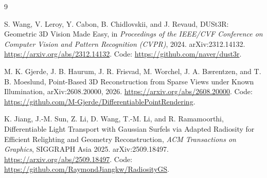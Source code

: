\documentclass[11pt,a4paper]{article}
\begin{document}
\begin{thebibliography}{9}

S. Wang, V. Leroy, Y. Cabon, B. Chidlovskii, and J. Revaud,
\newblock DUSt3R: Geometric 3D Vision Made Easy,
\newblock in \emph{Proceedings of the IEEE/CVF Conference on Computer
Vision and Pattern Recognition (CVPR)}, 2024.
\newblock arXiv:2312.14132.
\newblock \url{https://arxiv.org/abs/2312.14132}.
\newblock Code: \url{https://github.com/naver/dust3r}.

M. K. Gjerde, J. B. Haurum, J. R. Frisvad, M. Worchel,
J. A. B{\ae}rentzen, and T. B. Moeslund,
\newblock Point-Based 3D Reconstruction from Sparse Views under Known
Illumination,
\newblock arXiv:2608.20000, 2026.
\newblock \url{https://arxiv.org/abs/2608.20000}.
\newblock Code: \url{https://github.com/M-Gjerde/DifferentiablePointRendering}.

K. Jiang, J.-M. Sun, Z. Li, D. Wang, T.-M. Li, and R. Ramamoorthi,
\newblock Differentiable Light Transport with Gaussian Surfels via
Adapted Radiosity for Efficient Relighting and Geometry Reconstruction,
\newblock \emph{ACM Transactions on Graphics}, SIGGRAPH Asia 2025.
\newblock arXiv:2509.18497.
\newblock \url{https://arxiv.org/abs/2509.18497}.
\newblock Code: \url{https://github.com/RaymondJiangkw/RadiosityGS}.

\end{thebibliography}
\end{document}
